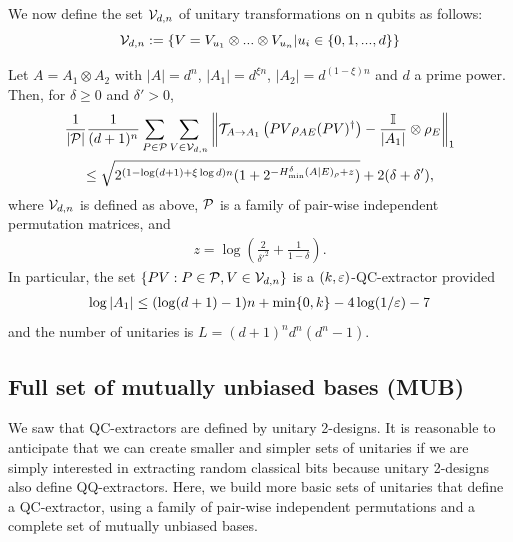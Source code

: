 We now define the set $\mathcal{V}_{d,n}$ of unitary transformations on n qubits as follows:
$$\mathcal{V}_{d, n} := \{V = V_{u_1} \otimes ... \otimes V_{u_n} | u_i \in \{0, 1,..., d\}\}$$

\begin{theorem}
\label{theorem:bitwiseqc}
    Let $A = A_{1} \otimes A_{2}$ with $|A| = d^{n}$, $|A_{1}| = d^{\xi n}$, $|A_{2}| = d^{(1 - \xi) n}$ and $d$ a prime power. Then, for $\delta \ge 0$ and $\delta' > 0$,
    \begin{multline}
        \frac{1}{|\mathcal{P}|} \frac{1}{(d + 1)^{n}} 
        \sum_{P \in \mathcal{P}} \sum_{V \in \mathcal{V}_{d, n}} 
        \left\|\mathcal{T}_{A \to A_{1}} \left(P V \rho_{A E} (P V)^{\dagger}\right) - \frac{\mathbb{I}}{|A_{1}|} \otimes \rho_{E}\right\|_{1} \notag \\
        \le \sqrt{2^{(1 - \log(d + 1) + \xi \log d) n} (1 + 2^{- H_{{\min}}^{\delta}(A | E)_{\rho} + z})} 
        + 2 (\delta + \delta'), 
    \end{multline}
    where $\mathcal{V}_{d, n}$ is defined as above, $\mathcal{P}$ is a family of pair-wise independent permutation matrices, and 
    \begin{align*}
        z = \log\left(\frac{2}{\delta'^{2}} + \frac{1}{1 - \delta}\right). 
    \end{align*}
    In particular, the set $\{P V: P \in \mathcal{P}, V \in \mathcal{V}_{d, n}\}$ is a $(k, \varepsilon)$-QC-extractor provided
    \begin{align*}
        \log |A_{1}| 
        \le (\log(d + 1) - 1) n + \min\{0, k\} 
        - 4 \log(1 / \varepsilon) - 7
    \end{align*}
    and the number of unitaries is $L = (d + 1)^{n} d^{n} (d^{n} - 1)$. 
\end{theorem}

\subsection{Full set of mutually unbiased bases (MUB)}

We saw that QC-extractors are defined by unitary 2-designs. It is reasonable to anticipate that we can create smaller and simpler sets of unitaries if we are simply interested in extracting random classical bits because unitary 2-designs also define QQ-extractors. Here, we build more basic sets of unitaries that define a QC-extractor, using a family of pair-wise independent permutations and a complete set of mutually unbiased bases.

